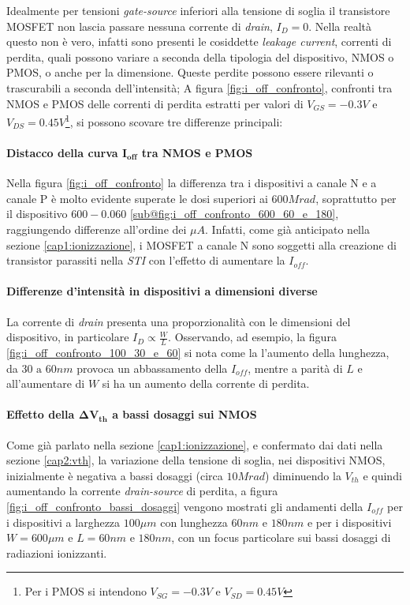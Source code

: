Idealmente per tensioni \textit{gate-source} inferiori alla tensione di soglia il transistore MOSFET non lascia passare nessuna corrente di \textit{drain}, $I_D = 0$. Nella realtà questo non è vero, infatti sono presenti le cosiddette \textit{leakage current}, correnti di perdita, quali possono variare a seconda della tipologia del dispositivo, NMOS o PMOS, o anche per la dimensione.
Queste perdite possono essere rilevanti o trascurabili a seconda dell'intensità; A figura \ref{fig:i_off_confronto}, confronti tra NMOS e PMOS delle correnti di perdita estratti per valori di $V_{GS} = -0.3V$ e $V_{DS} = 0.45V$\footnote{Per i PMOS si intendono $V_{SG} = -0.3V$ e $V_{SD} = 0.45V$}, si possono scovare tre differenze principali:
\paragraph*{Distacco della curva $\bm{I_{off}}$ tra NMOS e PMOS} Nella figura \ref{fig:i_off_confronto} la differenza tra i dispositivi a canale N e a canale P è molto evidente superate le dosi superiori ai $600Mrad$, soprattutto per il dispositivo $600-0.060$ \ref{sub@fig:i_off_confronto_600_60_e_180}, raggiungendo differenze all'ordine dei $\mu A$. Infatti, come già anticipato nella sezione \ref{cap1:ionizzazione}, i MOSFET a canale N sono soggetti alla creazione di transistor parassiti nella \textit{STI} con l'effetto di aumentare la $I_{off}$.

\paragraph*{Differenze d'intensità in dispositivi a dimensioni diverse} La corrente di \textit{drain} presenta una proporzionalità con le dimensioni del dispositivo, in particolare $I_{D} \propto \frac{W}{L}$. Osservando, ad esempio, la figura \ref{fig:i_off_confronto_100_30_e_60} si nota come la l'aumento della lunghezza, da $30 \text{ a } 60nm$ provoca un abbassamento della $I_{off}$, mentre a parità di $L$ e all'aumentare di $W$ si ha un aumento della corrente di perdita.

\paragraph*{Effetto della $\bm{\Delta V_{th}}$ a bassi dosaggi sui NMOS} Come già parlato nella sezione \ref{cap1:ionizzazione}, e confermato dai dati nella sezione \ref{cap2:vth}, la variazione della tensione di soglia, nei dispositivi NMOS, inizialmente è negativa a bassi dosaggi (circa $10Mrad$) diminuendo la $V_{th}$ e quindi aumentando la corrente \textit{drain-source} di perdita, a figura \ref{fig:i_off_confronto_bassi_dosaggi} vengono mostrati gli andamenti della $I_{off}$ per i dispositivi a larghezza $100\mu m$ con lunghezza $60 nm \text{ e } 180nm$ e per i dispositivi $W = 600\mu m$ e $L = 60 nm \text{ e } 180nm$, con un focus particolare sui bassi dosaggi di radiazioni ionizzanti.

